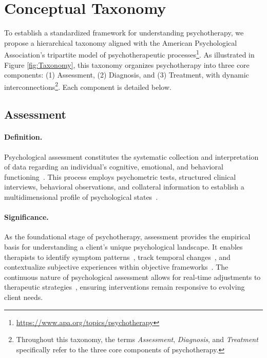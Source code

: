 \section{Conceptual Taxonomy}
\label{sec:taxonomy}



To establish a standardized framework for understanding psychotherapy, we propose a hierarchical taxonomy aligned with the American Psychological Association's tripartite model of psychotherapeutic processes\footnote{\url{https://www.apa.org/topics/psychotherapy}}. As illustrated in Figure \ref{fig:Taxonomy}, this taxonomy organizes psychotherapy into three core components: (1) Assessment, (2) Diagnosis, and (3) Treatment, with dynamic interconnections\footnote{Throughout this taxonomy, the terms \textit{Assessment}, \textit{Diagnosis}, and \textit{Treatment} specifically refer to the three core components of psychotherapy.}. Each component is detailed below.

\subsection{Assessment}

\paragraph{Definition.} Psychological assessment constitutes the systematic collection and interpretation of data regarding an individual's cognitive, emotional, and behavioral functioning~\cite{cohen1996psychological, kaplan2001psychological}. This process employs psychometric tests, structured clinical interviews, behavioral observations, and collateral information to establish a multidimensional profile of psychological states~\cite{groth2009handbook}.


\paragraph{Significance.} As the foundational stage of psychotherapy, assessment provides the empirical basis for understanding a client's unique psychological landscape. It enables therapists to identify symptom patterns~\cite{phillips2007assessing}, track temporal changes~\cite{barkham1993shape}, and contextualize subjective experiences within objective frameworks~\cite{groth2009handbook}. The continuous nature of psychological assessment allows for real-time adjustments to therapeutic strategies~\cite{schiepek2016real}, ensuring interventions remain responsive to evolving client needs.

